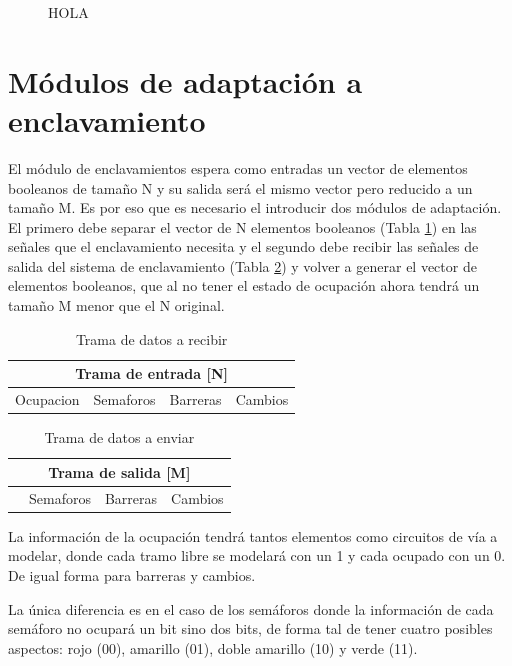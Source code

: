 	\begin{figure}[h]
	\centering
		\caption{HOLA}
		\label{fig:hola}
	\end{figure}
	
\section{Módulos de adaptación a enclavamiento}

	El módulo de enclavamientos espera como entradas un vector de elementos booleanos de tamaño N y su salida será el mismo vector pero reducido a un tamaño M. Es por eso que es necesario el introducir dos módulos de adaptación. El primero debe separar el vector de N elementos booleanos (Tabla \ref{Trama_in}) en las señales que el enclavamiento necesita y el segundo debe recibir las señales de salida del sistema de enclavamiento (Tabla \ref{Trama_out}) y volver a generar el vector de elementos booleanos, que al no tener el estado de ocupación ahora tendrá un tamaño M menor que el N original. 
	 
	\begin{table}[!hbt]
	\renewcommand{\arraystretch}{1.3}
	\caption{Trama de datos a recibir}
	\label{Trama_in}
	\centering
	\begin{tabular}{| c | c | c | c |}
	\multicolumn{4}{c}{Trama de entrada [N]} \\
	\hline
	Ocupacion & Semaforos & Barreras & Cambios \\	
	\hline
	\end{tabular}
	\end{table}	 
	
	\begin{table}[!hbt]
	\renewcommand{\arraystretch}{1.3}
	\caption{Trama de datos a enviar}
	\label{Trama_out}
	\centering
	\begin{tabular}{| c | c | c | c |}
	\multicolumn{4}{c}{Trama de salida [M]} \\
	\hline
	 & Semaforos & Barreras & Cambios \\
	\hline	
	\end{tabular}
	\end{table}	
	 
	La información de la ocupación tendrá tantos elementos como circuitos de vía a modelar, donde cada tramo libre se modelará con un 1 y cada ocupado con un 0. De igual forma para barreras y cambios.
	
	La única diferencia es en el caso de los semáforos donde la información de cada semáforo no ocupará un bit sino dos bits, de forma tal de tener cuatro posibles aspectos: rojo (00), amarillo (01), doble amarillo (10) y verde (11).
	 

